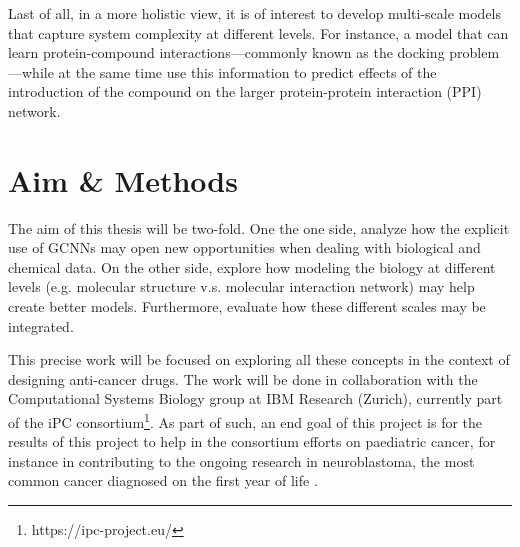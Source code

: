 \documentclass{article}
\begin{document}
Last of all, in a more holistic view, it is of interest to develop multi-scale models
that capture system complexity at different levels. For instance, a model that can learn
protein-compound interactions---commonly known as the docking problem---while at the
same time use this information to predict effects of the introduction of the compound on
the larger protein-protein interaction (PPI) network\cite{Sun2019}.

    \section*{Aim \& Methods}

The aim of this thesis will be two-fold. One the one side, analyze how the explicit
use of GCNNs may open new opportunities when dealing with biological and chemical
data. On the other side, explore how modeling the biology at different levels (e.g.
molecular structure v.s. molecular interaction network) may help create better
models. Furthermore, evaluate how these different scales may be integrated.

This precise work will be focused on exploring all these concepts in the context of
designing anti-cancer drugs. The work will be done in collaboration with the
Computational Systems Biology group at IBM Research (Zurich), currently part of the iPC
consortium\footnote{https://ipc-project.eu/}. As part of such, an end goal of this
project is for the results of this project to help in the consortium efforts on
paediatric cancer, for instance in contributing to the ongoing research in
neuroblastoma, the most common cancer diagnosed on the first year of life
\cite{Maris2010}.
\end{document}
